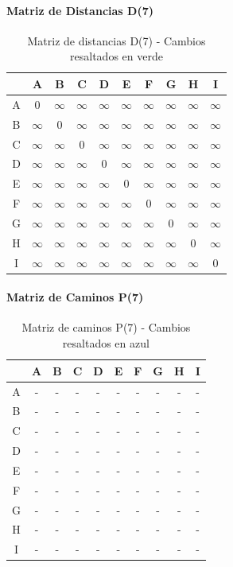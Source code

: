 \documentclass[12pt]{article}
\begin{document}
\paragraph{Matriz de Distancias D(7)}
\begin{table}[h!]
\centering
\begin{tabular}{|c|c|c|c|c|c|c|c|c|c|}
\hline
 & A & B & C & D & E & F & G & H & I \\\hline
A & 0 & $\infty$ & $\infty$ & $\infty$ & $\infty$ & $\infty$ & $\infty$ & $\infty$ & $\infty$ \\\hline
B & $\infty$ & 0 & $\infty$ & $\infty$ & $\infty$ & $\infty$ & $\infty$ & $\infty$ & $\infty$ \\\hline
C & $\infty$ & $\infty$ & 0 & $\infty$ & $\infty$ & $\infty$ & $\infty$ & $\infty$ & $\infty$ \\\hline
D & $\infty$ & $\infty$ & $\infty$ & 0 & $\infty$ & $\infty$ & $\infty$ & $\infty$ & $\infty$ \\\hline
E & $\infty$ & $\infty$ & $\infty$ & $\infty$ & 0 & $\infty$ & $\infty$ & $\infty$ & $\infty$ \\\hline
F & $\infty$ & $\infty$ & $\infty$ & $\infty$ & $\infty$ & 0 & $\infty$ & $\infty$ & $\infty$ \\\hline
G & $\infty$ & $\infty$ & $\infty$ & $\infty$ & $\infty$ & $\infty$ & 0 & $\infty$ & $\infty$ \\\hline
H & $\infty$ & $\infty$ & $\infty$ & $\infty$ & $\infty$ & $\infty$ & $\infty$ & 0 & $\infty$ \\\hline
I & $\infty$ & $\infty$ & $\infty$ & $\infty$ & $\infty$ & $\infty$ & $\infty$ & $\infty$ & 0 \\\hline
\end{tabular}
\caption{Matriz de distancias D(7) - Cambios resaltados en verde}
\end{table}

\paragraph{Matriz de Caminos P(7)}
\begin{table}[h!]
\centering
\begin{tabular}{|c|c|c|c|c|c|c|c|c|c|}
\hline
 & A & B & C & D & E & F & G & H & I \\\hline
A & - & - & - & - & - & - & - & - & - \\\hline
B & - & - & - & - & - & - & - & - & - \\\hline
C & - & - & - & - & - & - & - & - & - \\\hline
D & - & - & - & - & - & - & - & - & - \\\hline
E & - & - & - & - & - & - & - & - & - \\\hline
F & - & - & - & - & - & - & - & - & - \\\hline
G & - & - & - & - & - & - & - & - & - \\\hline
H & - & - & - & - & - & - & - & - & - \\\hline
I & - & - & - & - & - & - & - & - & - \\\hline
\end{tabular}
\caption{Matriz de caminos P(7) - Cambios resaltados en azul}
\end{table}
\end{document}
